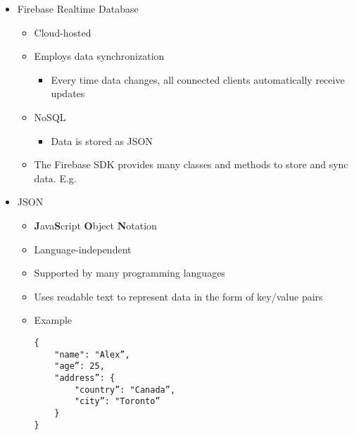 \documentclass[11pt]{article}
\begin{document}
\begin{itemize}
	\item Firebase Realtime Database
		\begin{itemize}
			\item Cloud-hosted
			\item Employs data synchronization
				\begin{itemize}
					\item Every time data changes, all connected clients automatically receive updates
				\end{itemize}
			\item NoSQL
				\begin{itemize}
					\item Data is stored as JSON
				\end{itemize}
			\item The Firebase SDK provides many classes and methods to store and sync data. E.g.
		\end{itemize}

	\item JSON
		\begin{itemize}
			\item \textbf{J}ava\textbf{S}cript \textbf{O}bject \textbf{N}otation
			\item Language-independent
			\item Supported by many programming languages
			\item Uses readable text to represent data in the form of key/value pairs
			\item Example \begin{Verbatim}
{
	"name": "Alex”,
	"age”: 25,
	"address”: {
		"country”: "Canada”,
		"city”: "Toronto”
	}
}
			\end{Verbatim}

		\end{itemize}
\end{itemize}

\newpage
\end{document}
